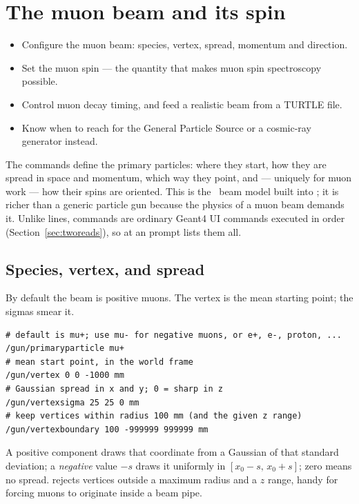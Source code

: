 \chapter{The muon beam and its spin}
\label{ch:beam}

\begin{willdo}
\begin{itemize}
  \item Configure the muon beam: species, vertex, spread, momentum and direction.
  \item Set the muon spin --- the quantity that makes muon spin spectroscopy possible.
  \item Control muon decay timing, and feed a realistic beam from a TURTLE file.
  \item Know when to reach for the General Particle Source or a cosmic-ray generator instead.
\end{itemize}
\end{willdo}

The  commands define the primary particles: where they start, how they are spread in space and momentum, which way they point, and --- uniquely for muon work --- how their spins are oriented. This is the \muSR\ beam model built into \musrSim; it is richer than a generic particle gun because the physics of a muon beam demands it. Unlike  lines,  commands are ordinary Geant4 UI commands executed in order (Section~\ref{sec:tworeads}), so  at an  prompt lists them all.

\section{Species, vertex, and spread}
By default the beam is positive muons. The vertex is the mean starting point; the sigmas smear it.

\begin{lstlisting}[style=mac,caption={A spatially spread beam (from \texttt{201.mac})}]
# default is mu+; use mu- for negative muons, or e+, e-, proton, ...
/gun/primaryparticle mu+
# mean start point, in the world frame
/gun/vertex 0 0 -1000 mm
# Gaussian spread in x and y; 0 = sharp in z
/gun/vertexsigma 25 25 0 mm
# keep vertices within radius 100 mm (and the given z range)
/gun/vertexboundary 100 -999999 999999 mm
\end{lstlisting}

A positive  component draws that coordinate from a Gaussian of that standard deviation; a \emph{negative} value \(-s\) draws it uniformly in \([x_0-s,\,x_0+s]\); zero means no spread.  rejects vertices outside a maximum radius and a \(z\) range, handy for forcing muons to originate inside a beam pipe.

